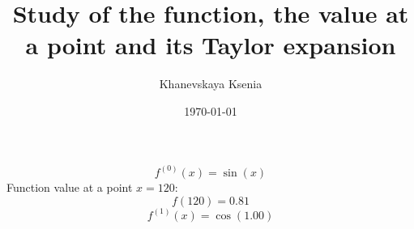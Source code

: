\documentclass[12pt, letterpaper]{article}
\title {Study of the function, the value at a point and its Taylor expansion}
\author{Khanevskaya Ksenia}
\date{\today}
\begin{document}
\maketitle
\[f^{(0)}(x)=\sin(x)\]
Function value at a point $x=120$: \[f(120)=0.81\]
\[f^{(1)}(x)=\cos(1.00)\]
\end{document}
